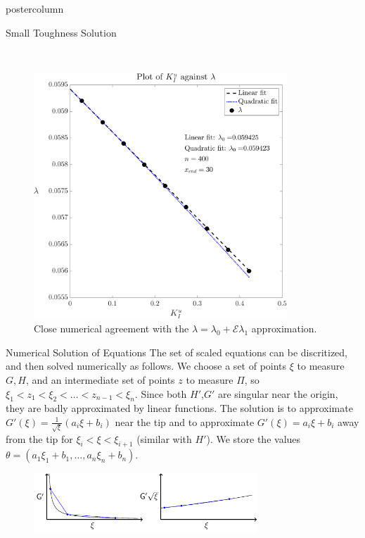 \documentclass{beamer}
\newcommand{\cE}{\mathcal{E}}                               %
\begin{document}
\begin{frame}
\begin{columns}
\begin{column}{.57\textwidth}
\begin{beamercolorbox}[center]{postercolumn}
\begin{minipage}{.98\textwidth}
{\begin{myblock}{Small Toughness Solution}
\begin{figure}
\begin{minipage}{0.5\textwidth}
\end{minipage}
\begin{minipage}{0.05\textwidth}
~
\end{minipage}
\begin{minipage}{0.4\textwidth}
\centering\includegraphics[width=0.85\textwidth]{./../Graphs/l0.pdf}
\caption{Close numerical agreement with the $\lambda = \lambda_0 + \cE 
\lambda_1$ approximation.}
\end{minipage}
\end{figure}
\end{myblock}\vfill
\begin{myblock}{Numerical Solution of Equations}
The set of scaled equations can be discritized, and then solved numerically
as follows. We choose a set of points $\xi$ to measure $G,H$, and an 
intermediate set of points $z$ to measure $\Pi$, so $\xi_1 < z_1 < \xi_2 <
\dots < z_{n-1} < \xi_n$.
Since both $H'$,$G'$ are singular near the origin, they
are badly approximated by linear functions.
The solution is to approximate $G'(\xi) = \frac{1}{\sqrt{\xi}}(a_i \xi + b_i)$
near the tip and to approximate $G'(\xi) = a_i \xi + b_i$ away from the tip 
for $\xi_i < \xi < \xi_{i+1}$ (similar with $H'$). We store the values 
$\theta = (a_1 \xi_1 + b_1, \dots , a_n \xi_n +b_n)$.
\begin{figure}
\begin{minipage}{0.9\textwidth}
\centering\includegraphics[width=0.75\textwidth]{Fig9.pdf}

\end{minipage}
\end{figure}
\end{myblock}}
\end{minipage}
\end{beamercolorbox}
\end{column}
\end{columns}
\end{frame}
\end{document}
